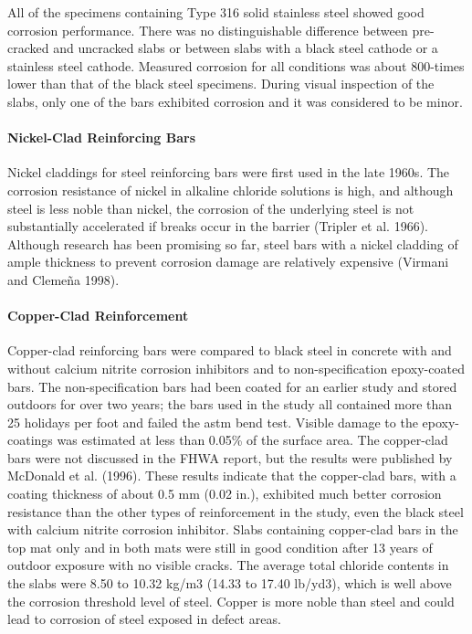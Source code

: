 All of the specimens containing Type 316 solid stainless steel showed good corrosion performance. There was no distinguishable difference between pre-cracked and uncracked slabs or between slabs with a black steel cathode or a stainless steel cathode. Measured corrosion for all conditions was about 800-times lower than that of the black steel specimens. During visual inspection of the slabs, only one of the bars exhibited corrosion and it was considered to be minor.


\paragraph{Nickel-Clad Reinforcing Bars}
Nickel claddings for steel reinforcing bars were first used in the late 1960s. The corrosion resistance of nickel in alkaline chloride solutions is high, and although steel is less noble than nickel, the corrosion of the underlying steel is not substantially accelerated if breaks occur in the barrier (Tripler et al. 1966). Although research has been promising so far, steel bars with a nickel cladding of ample thickness to prevent corrosion damage are relatively expensive (Virmani and Clemeña 1998).


\paragraph{Copper-Clad Reinforcement}
Copper-clad reinforcing bars were compared to black steel in concrete with and without calcium nitrite corrosion inhibitors and to non-specification epoxy-coated bars. The non-specification bars had been coated for an earlier study and stored outdoors for over two years; the bars used in the study all contained more than 25 holidays per foot and failed the \acrshort*{astm} bend test. Visible damage to the epoxy-coatings was estimated at less than 0.05\% of the surface area. The copper-clad bars were not discussed in the FHWA report, but the results were published by McDonald et al. (1996). These results indicate that the copper-clad bars, with a coating thickness of about 0.5 mm (0.02 in.), exhibited much better corrosion resistance than the other types of reinforcement in the study, even the black steel with calcium nitrite corrosion inhibitor. Slabs containing copper-clad bars in the top mat only and in both mats were still in good condition after 13 years of outdoor exposure with no visible cracks. The average total chloride contents in the slabs were 8.50 to 10.32 kg/m3 (14.33 to 17.40 lb/yd3), which is well above the corrosion threshold level of steel. Copper is more noble than steel and could lead to corrosion of steel exposed in defect areas.

